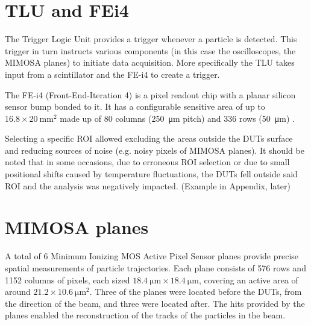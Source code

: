 

\section{TLU and FEi4}

The Trigger Logic Unit provides a trigger whenever a particle is detected. This trigger in turn instructs various components (in this case the oscilloscopes, the MIMOSA planes) to initiate data acquisition. More specifically the TLU takes input from a scintillator and the FE-i4 to create a trigger.

The FE-i4 (Front-End-Iteration 4) is a pixel readout chip with a planar silicon sensor bump bonded to it. It has a configurable sensitive area of up to \(\num{16.8} \times \qty{20}{\milli\meter^2}\) made up of 80 columns (\qty{250}{\micro\meter} pitch) and 336 rows (\qty{50}{\micro\meter}) \cite{Obermann:2014goa}. 

Selecting a specific ROI allowed excluding the areas outside the DUTs surface and reducing sources of noise (e.g. noisy pixels of MIMOSA planes). It should be noted that in some occasions, due to erroneous ROI selection or due to small positional shifts caused by temperature fluctuations, the DUTs fell outside said ROI and the analysis was negatively impacted. (Example in Appendix, later)
 
\section{MIMOSA planes}

A total of 6 Minimum Ionizing MOS Active Pixel Sensor planes \cite{Hu-Guo:2010lrq} provide precise spatial measurements of particle trajectories. Each plane consists of 576 rows and 1152 columns of pixels, each sized \(\qty{18.4}{\micro\meter} \times \qty{18.4}{\micro\meter}\), covering an active area of around \(\num{21.2} \times \qty{10.6}{\micro\meter^2}\). Three of the planes were located before the DUTs, from the direction of the beam, and three were located after. The hits provided by the planes enabled the reconstruction of the tracks of the particles in the beam.

